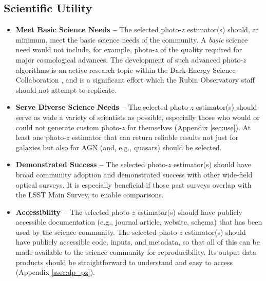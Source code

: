\documentclass[DM,authoryear,toc]{lsstdoc}
\begin{document}
\subsection{Scientific Utility}
\begin{itemize}
\item \textbf{Meet Basic Science Needs -- } 
The selected photo-$z$ estimator(s) should, at minimum, meet the basic science needs of the community.
A {\it basic} science need would not include, for example, photo-$z$ of the quality required for major cosmological advances. 
The development of such advanced photo-$z$ algorithms is an active research topic within the Dark Energy Science Collaboration \citep{2018arXiv180901669T}, and is a significant effort which the Rubin Observatory staff should not attempt to replicate. 
\item \textbf{Serve Diverse Science Needs -- }
The selected photo-$z$ estimator(s) should serve as wide a variety of scientists as possible, especially those who would or could not generate custom photo-$z$ for themselves (Appendix \ref{sec:use}). 
At least one photo-$z$ estimator that can return reliable results not just for galaxies but also for AGN (and, e.g., quasars) should be selected.
\item \textbf{Demonstrated Success -- }
The selected photo-$z$ estimator(s) should have broad community adoption and demonstrated success with other wide-field optical surveys.
It is especially beneficial if those past surveys overlap with the LSST Main Survey, to enable comparisons.
\item \textbf{Accessibility --} The selected photo-$z$ estimator(s) should have publicly accessible documentation (e.g., journal article, website, schema) that has been used by the science community.
The selected photo-$z$ estimator(s) should have publicly accessible code, inputs, and metadata, so that all of this can be made available to the science community for reproducibility. 
Its output data products should be straightforward to understand and easy to access (Appendix \ref{ssec:dp_pz}).
\end{itemize}
\end{document}
